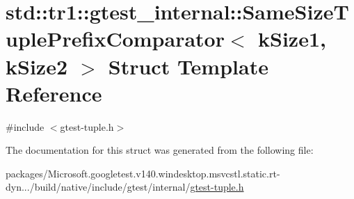 \hypertarget{structstd_1_1tr1_1_1gtest__internal_1_1_same_size_tuple_prefix_comparator}{}\section{std\+::tr1\+::gtest\+\_\+internal\+::Same\+Size\+Tuple\+Prefix\+Comparator$<$ k\+Size1, k\+Size2 $>$ Struct Template Reference}
\label{structstd_1_1tr1_1_1gtest__internal_1_1_same_size_tuple_prefix_comparator}


{\ttfamily \#include $<$gtest-\/tuple.\+h$>$}



The documentation for this struct was generated from the following file\+:\begin{DoxyCompactItemize}
\item 
packages/\+Microsoft.\+googletest.\+v140.\+windesktop.\+msvcstl.\+static.\+rt-\/dyn.../build/native/include/gtest/internal/\mbox{\hyperlink{gtest-tuple_8h}{gtest-\/tuple.\+h}}\end{DoxyCompactItemize}
